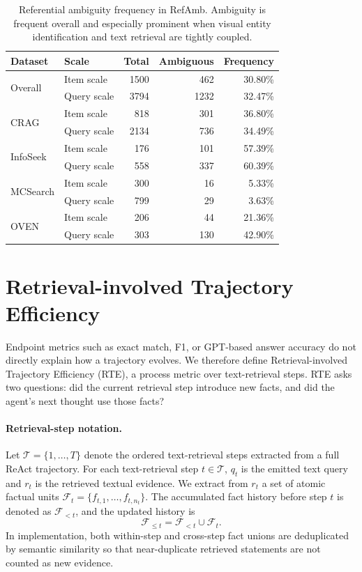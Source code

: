 \documentclass{article}
\newcommand{\query}{q}
\newcommand{\facts}{\mathcal{F}}
\begin{document}
\begin{table}[t]
\centering
\small
\setlength{\tabcolsep}{5pt}
\begin{tabular}{llrrr}
\toprule
\textbf{Dataset} & \textbf{Scale} & \textbf{Total} & \textbf{Ambiguous} & \textbf{Frequency} \\
\midrule
\multirow{2}{*}{Overall}  & Item scale  & 1500 & 462  & 30.80\% \\
                           & Query scale & 3794 & 1232 & 32.47\% \\
\multirow{2}{*}{CRAG}     & Item scale  & 818  & 301  & 36.80\% \\
                           & Query scale & 2134 & 736  & 34.49\% \\
\multirow{2}{*}{InfoSeek} & Item scale  & 176  & 101  & 57.39\% \\
                           & Query scale & 558  & 337  & 60.39\% \\
\multirow{2}{*}{MCSearch} & Item scale  & 300  & 16   & 5.33\% \\
                           & Query scale & 799  & 29   & 3.63\% \\
\multirow{2}{*}{OVEN}     & Item scale  & 206  & 44   & 21.36\% \\
                           & Query scale & 303  & 130  & 42.90\% \\
\bottomrule
\end{tabular}
\caption{Referential ambiguity frequency in RefAmb. Ambiguity is frequent overall and especially prominent when visual entity identification and text retrieval are tightly coupled.}
\label{tab:ambiguity-frequency}
\end{table}

\section{Retrieval-involved Trajectory Efficiency}
Endpoint metrics such as exact match, F1, or GPT-based answer accuracy do not directly explain how a trajectory evolves.
We therefore define Retrieval-involved Trajectory Efficiency (RTE), a process metric over text-retrieval steps.
RTE asks two questions: did the current retrieval step introduce new facts, and did the agent's next thought use those facts?

\paragraph{Retrieval-step notation.}
Let $\mathcal{T}=\{1,\ldots,T\}$ denote the ordered text-retrieval steps extracted from a full ReAct trajectory.
For each text-retrieval step $t\in\mathcal{T}$, $\query_t$ is the emitted text query and $r_t$ is the retrieved textual evidence.
We extract from $r_t$ a set of atomic factual units $\facts_t=\{f_{t,1},\ldots,f_{t,n_t}\}$.
The accumulated fact history before step $t$ is denoted as $\facts_{<t}$, and the updated history is
\begin{equation}
    \facts_{\leq t} = \facts_{<t} \cup \facts_t.
\end{equation}
In implementation, both within-step and cross-step fact unions are deduplicated by semantic similarity so that near-duplicate retrieved statements are not counted as new evidence.
\end{document}
